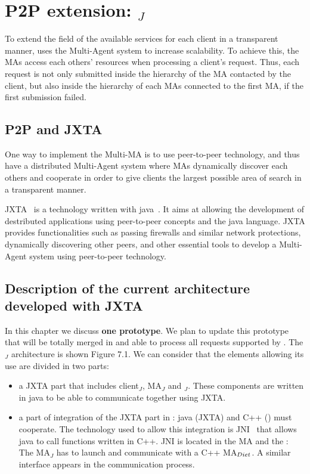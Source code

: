 \chapter{P2P \diet extension: \diet$_{J}$}
\label{ch:p2pextension}

To extend the field of the available services for each client in a
transparent manner, \diet uses the Multi-Agent system to increase
scalability. To achieve this, the MAs access each others' resources
when processing a client's request. Thus, each request is not only
submitted inside the hierarchy of the MA contacted by the client, but
also inside the hierarchy of each MAs connected to the first MA, if the
first submission failed.

\section{P2P and JXTA}
\label{sec:JXTA}

One way to implement the Multi-MA is to use peer-to-peer technology,
and thus have a distributed Multi-Agent system where MAs dynamically
discover each others and cooperate in order to give clients the largest
possible area of search in a transparent manner.

JXTA~\cite{JXTA} is a technology written with java~\cite{java}. It
aims at allowing the development of destributed applications using
peer-to-peer concepts and the java language. JXTA provides
functionalities such as passing firewalls and similar network
protections, dynamically discovering other peers, and other essential
tools to develop a Multi-Agent system using peer-to-peer technology.

\section{Description of the current architecture developed with JXTA}
\label{sec:archi}

In this chapter we discuss \textbf{one prototype}. We plan to update
this prototype that will be totally merged in \diet and able to process
all requests supported by \diet. The \diet$_{J}$ architecture is shown
Figure 7.1.  We can consider that the elements allowing its use are
divided in two parts:

\begin{itemize}
\item{a JXTA part that includes client$_{J}$, MA$_{J}$ and
    \sed$_{J}$. These components are written in java to be able to
    communicate together using JXTA.}
  
\item{a part of integration of the JXTA part in \diet: java (JXTA) and
    C++ (\diet) must cooperate. The technology used to allow this
    integration is JNI~\cite{JNI} that allows java to call functions
    written in C++. JNI is located in the MA and the \sed: The
    MA$_{J}$ has to launch and communicate with a C++ MA$_{{\sc Diet}}$.
    A similar interface appears in the \sed communication process.}
\end{itemize}


